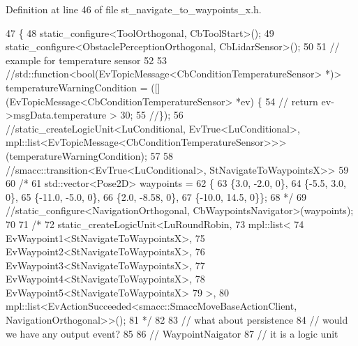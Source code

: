 Definition at line 46 of file st\+\_\+navigate\+\_\+to\+\_\+waypoints\+\_\+x.\+h.


\begin{DoxyCode}
47   \{
48     static\_configure<ToolOrthogonal, CbToolStart>();
49     static\_configure<ObstaclePerceptionOrthogonal, CbLidarSensor>();
50     
51     \textcolor{comment}{// example for temperature sensor}
52 
53     \textcolor{comment}{//std::function<bool(EvTopicMessage<CbConditionTemperatureSensor> *)> temperatureWarningCondition =
       ([](EvTopicMessage<CbConditionTemperatureSensor> *ev) \{}
54     \textcolor{comment}{//  return ev->msgData.temperature > 30;}
55     \textcolor{comment}{//\});}
56     \textcolor{comment}{//static\_createLogicUnit<LuConditional, EvTrue<LuConditional>,
       mpl::list<EvTopicMessage<CbConditionTemperatureSensor>>>(temperatureWarningCondition);}
57 
58     \textcolor{comment}{//smacc::transition<EvTrue<LuConditional>, StNavigateToWaypointsX>>}
59 
60     \textcolor{comment}{/*}
61 \textcolor{comment}{    std::vector<Pose2D> waypoints =}
62 \textcolor{comment}{        \{}
63 \textcolor{comment}{            \{3.0, -2.0, 0\},}
64 \textcolor{comment}{            \{-5.5, 3.0, 0\},}
65 \textcolor{comment}{            \{-11.0, -5.0, 0\},}
66 \textcolor{comment}{            \{2.0, -8.58, 0\},}
67 \textcolor{comment}{            \{-10.0, 14.5, 0\}\};}
68 \textcolor{comment}{*/}
69     \textcolor{comment}{//static\_configure<NavigationOrthogonal, CbWaypointsNavigator>(waypoints);}
70 
71     \textcolor{comment}{/*}
72 \textcolor{comment}{    static\_createLogicUnit<LuRoundRobin, }
73 \textcolor{comment}{                              mpl::list<}
74 \textcolor{comment}{                                   EvWaypoint1<StNavigateToWaypointsX>,}
75 \textcolor{comment}{                                   EvWaypoint2<StNavigateToWaypointsX>,}
76 \textcolor{comment}{                                   EvWaypoint3<StNavigateToWaypointsX>, }
77 \textcolor{comment}{                                   EvWaypoint4<StNavigateToWaypointsX>,}
78 \textcolor{comment}{                                   EvWaypoint5<StNavigateToWaypointsX>}
79 \textcolor{comment}{                                  >, }
80 \textcolor{comment}{                         mpl::list<EvActionSucceeded<smacc::SmaccMoveBaseActionClient,
       NavigationOrthogonal>>();}
81 \textcolor{comment}{                         */}
82 
83     \textcolor{comment}{// what about persistence}
84     \textcolor{comment}{// would we have any output event?}
85 
86     \textcolor{comment}{// WaypointNaigator}
87     \textcolor{comment}{// it is a logic unit}

\end{DoxyCode}
